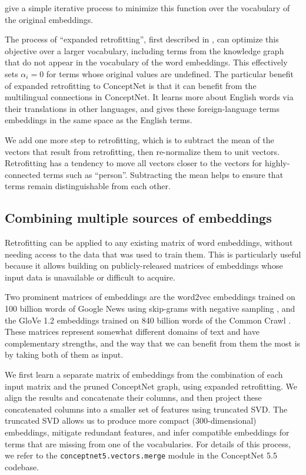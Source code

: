 \documentclass[letterpaper]{article}
\begin{document}
\citeauthor{faruqui2015retrofitting} give a simple iterative process to minimize
this function over the vocabulary of the original embeddings.

The process of ``expanded retrofitting'', first described in
\cite{speer2016ensemble}, can optimize this objective over a larger vocabulary,
including terms from the knowledge graph that do not appear in the vocabulary
of the word embeddings. This effectively sets $\alpha_i = 0$ for terms whose
original values are undefined. The particular benefit of expanded retrofitting
to ConceptNet is that it can benefit from the multilingual connections in
ConceptNet. It learns more about English words via their translations in other
languages, and gives these foreign-language terms embeddings in the same space
as the English terms.

We add one more step to retrofitting, which is to subtract the mean of the
vectors that result from retrofitting, then re-normalize them to unit vectors.
Retrofitting has a tendency to move all vectors closer to the vectors for
highly-connected terms such as ``person''. Subtracting the mean helps to ensure
that terms remain distinguishable from each other.

\subsection{Combining multiple sources of embeddings}

Retrofitting can be applied to any existing matrix of word embeddings, without
needing access to the data that was used to train them. This is particularly
useful because it allows building on publicly-released matrices of embeddings
whose input data is unavailable or difficult to acquire.

Two prominent matrices of embeddings are the word2vec embeddings trained on 100
billion words of Google News using skip-grams with negative sampling
\cite{mikolov2013word2vec}, and the GloVe 1.2 embeddings trained on 840 billion
words of the Common Crawl \cite{pennington2014glove}. These matrices represent
somewhat different domains of text and have complementary strengths, and the
way that we can benefit from them the most is by taking both of them as input.

We first learn a separate matrix of embeddings from the combination of each
input matrix and the pruned ConceptNet graph, using expanded retrofitting. We
align the results and concatenate their columns, and then project these
concatenated columns into a smaller set of features using truncated SVD. The
truncated SVD allows us to produce more compact (300-dimensional) embeddings,
mitigate redundant features, and infer compatible embeddings for terms that
are missing from one of the vocabularies. For details of this process, we
refer to the \texttt{conceptnet5.vectors.merge} module in the ConceptNet 5.5
codebase.
\end{document}
